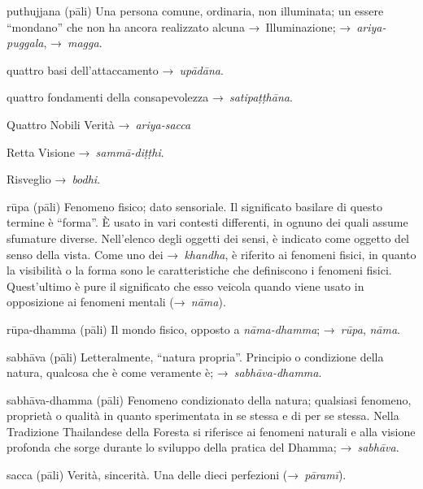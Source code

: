 \begin{glossarydescription}
\item[puthujjana] (pāli) Una persona comune, ordinaria, non illuminata; un
  essere ``mondano'' che non ha ancora realizzato alcuna →~Illuminazione;
  →~\emph{ariya-puggala}, →~\emph{magga}.


\item[quattro basi dell'attaccamento] →~\emph{upādāna}.

\item[quattro fondamenti della consapevolezza] →~\emph{satipaṭṭhāna}.

\item[Quattro Nobili Verità] →~\emph{ariya-sacca}


\item[Retta Visione] →~\emph{sammā-diṭṭhi}.

\item[Risveglio] →~\emph{bodhi}.

\item[rūpa] (pāli) Fenomeno fisico; dato sensoriale. Il significato basilare di
  questo termine è ``forma''. È usato in vari contesti differenti, in ognuno dei
  quali assume sfumature diverse. Nell'elenco degli oggetti dei sensi, è
  indicato come oggetto del senso della vista. Come uno dei →~\emph{khandha}, è
  riferito ai fenomeni fisici, in quanto la visibilità o la forma sono le
  caratteristiche che definiscono i fenomeni fisici. Quest'ultimo è pure il
  significato che esso veicola quando viene usato in opposizione ai fenomeni
  mentali (→~\emph{nāma}).

\item[rūpa-dhamma] (pāli) Il mondo fisico, opposto a \emph{nāma-dhamma};
  →~\emph{rūpa}, \emph{nāma}.


\item[sabhāva] (pāli) Letteralmente, ``natura propria''. Principio o condizione
  della natura, qualcosa che è come veramente è; →~\emph{sabhāva-dhamma}.

\item[sabhāva-dhamma] (pāli) Fenomeno condizionato della natura; qualsiasi
  fenomeno, proprietà o qualità in quanto sperimentata in se stessa e di per se
  stessa. Nella Tradizione Thailandese della Foresta si riferisce ai fenomeni
  naturali e alla visione profonda che sorge durante lo sviluppo della pratica
  del Dhamma; →~\emph{sabhāva}.

\item[sacca] (pāli) Verità, sincerità. Una delle dieci perfezioni
  (→~\emph{pāramī}).


\end{glossarydescription}
